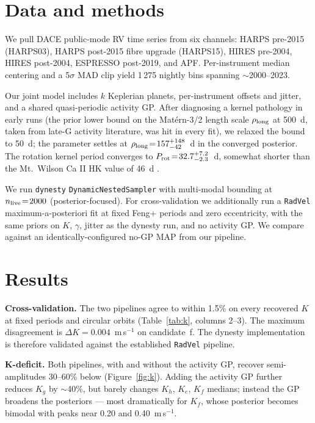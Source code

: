 \documentclass[RNAAS]{aastex701}
\begin{document}
\section{Data and methods}

We pull DACE \citep{Buchschacher2015} public-mode RV time series from six channels: HARPS pre-2015 (HARPS03), HARPS post-2015 fibre upgrade (HARPS15), HIRES pre-2004, HIRES post-2004, ESPRESSO post-2019, and APF. Per-instrument median centering and a 5$\sigma$ MAD clip yield 1\,275 nightly bins spanning $\sim$2000--2023.

Our joint model includes $k$ Keplerian planets, per-instrument offsets and jitter, and a shared quasi-periodic activity GP. After diagnosing a kernel pathology in early runs (the prior lower bound on the Mat\'ern-3/2 length scale $\rho_{\rm long}$ at 500~d, taken from late-G activity literature, was hit in every fit), we relaxed the bound to 50~d; the parameter settles at $\rho_{\rm long}\!=\!157^{+148}_{-42}$~d in the converged posterior. The rotation kernel period converges to $P_{\rm rot}\!=\!32.7^{+7.2}_{-2.3}$~d, somewhat shorter than the Mt.~Wilson Ca II HK value of 46~d \citep{Baliunas1996}.

We run \texttt{dynesty} \texttt{DynamicNestedSampler} with multi-modal bounding at $n_{\rm live}\!=\!2000$ (posterior-focused). For cross-validation we additionally run a \texttt{RadVel} maximum-a-posteriori fit at fixed Feng+ periods and zero eccentricity, with the same priors on $K$, $\gamma$, jitter as the dynesty run, and no activity GP. We compare against an identically-configured no-GP MAP from our pipeline.

\section{Results}

\textbf{Cross-validation.} The two pipelines agree to within 1.5\% on every recovered $K$ at fixed periods and circular orbits (Table~\ref{tab:k}, columns 2--3). The maximum disagreement is $\Delta K\!=\!0.004$~m\,s$^{-1}$ on candidate~f. The dynesty implementation is therefore validated against the established \texttt{RadVel} pipeline.

\textbf{K-deficit.} Both pipelines, with and without the activity GP, recover semi-amplitudes 30--60\% below \citet{Feng2017} (Figure~\ref{fig:k}). Adding the activity GP further reduces $K_g$ by $\sim$40\%, but barely changes $K_h$, $K_e$, $K_f$ medians; instead the GP broadens the posteriors --- most dramatically for $K_f$, whose posterior becomes bimodal with peaks near 0.20 and 0.40~m\,s$^{-1}$.
\end{document}
